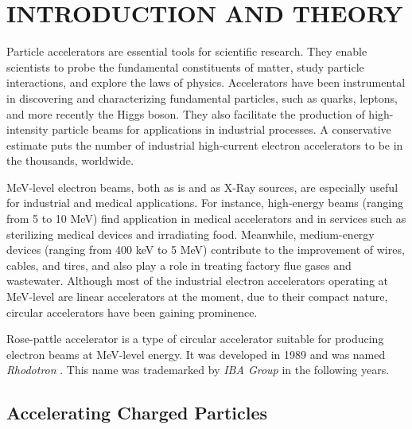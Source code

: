 \documentclass[a4paper,oneside,12pt]{report}
\numberwithin{equation}{chapter}
\begin{document}
\newcommand{\fromch}[1]{Chapter \ref{ch:#1}}

\newcommand{\fromsec}[1]{Section \ref{sec:#1}}
\newcommand{\fromsecs}[2]{Sections \ref{sec:#1} and \ref{sec:#2}}

\newcommand{\fromapp}[1]{Appendix \ref{appendix:#1}}

\newcommand{\fromtab}[1]{Table \ref{tab:#1}}
\newcommand{\fromtabs}[2]{Tables \ref{tab:#1} and \ref{tab:#2}}
\newcommand{\fromtabf}[4]{Tables \ref{tab:#1}, \ref{tab:#2}, \ref{tab:#3} and \ref{tab:#4}}



\chapter{INTRODUCTION AND THEORY}

Particle accelerators are essential tools for scientific research. They enable scientists to probe the fundamental constituents of matter, study particle interactions, and explore the laws of physics. 
Accelerators have been instrumental in discovering and characterizing fundamental particles, such as quarks, leptons, and more recently the Higgs boson. 
They also facilitate the production of high-intensity particle beams for applications in industrial processes. A conservative estimate puts the number of industrial high-current electron
accelerators to be in the thousands, worldwide.

MeV-level electron beams, both as is and as X-Ray sources, are especially useful for industrial and medical applications. 
For instance,  high-energy beams (ranging from 5 to 10 MeV) find application in medical accelerators and in services such as sterilizing medical devices and irradiating food. 
Meanwhile, medium-energy devices (ranging from 400 keV to 5 MeV) contribute to the improvement of wires, cables, and tires, and also play a role in treating factory flue gases and wastewater.
Although most of the industrial electron accelerators operating at MeV-level are linear accelerators at the moment, due to their compact nature, circular accelerators have been gaining prominence. 

Rose-pattle accelerator is a type of circular accelerator suitable for producing electron beams at MeV-level energy. 
It was developed in 1989 and was named \textit{Rhodotron} \cite{rhodo_pottier}. This name was trademarked by \textit{IBA Group} in the following years. 


\newpage
\section{Accelerating Charged Particles}
\end{document}
